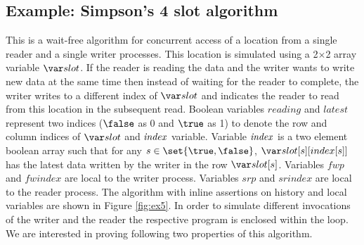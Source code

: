 \subsection{Example: Simpson's 4 slot algorithm \cite{Simpson4slot}}
This is a wait-free algorithm for concurrent access of a location from a single reader and a single writer processes. This location is 
simulated using a 2$\times$2 array variable $\slot$. If the
reader is reading the data and the writer wants to write new data at the same time then 
instead of waiting for the reader to complete, the writer writes to a different index of $\slot$ and 
indicates the reader to read from this location in the subsequent read. 
Boolean variables $reading$ and $latest$ represent two indices ($\false$ as 0 and $\true$ as 1) to denote the row and column 
indices of $\slot$ and $\mathit{index}$ variable. Variable $\mathit{index}$ is a two element boolean array such that for any $s\in \set{\true,\false}$, 
$\slot[s][index[s]]$ has the latest data written by the writer in the row $\slot[s]$. Variables $fwp$ and $fwindex$ are local to the writer process. 
Variables $srp$ and $srindex$ are local to the reader process. The algorithm with inline assertions 
on history and local variables are shown in Figure \ref{fig:ex5}. In order to simulate different invocations of the writer and the reader 
the respective program is enclosed within the loop. We are interested in proving following two properties of this algorithm.

\FigureExV	


